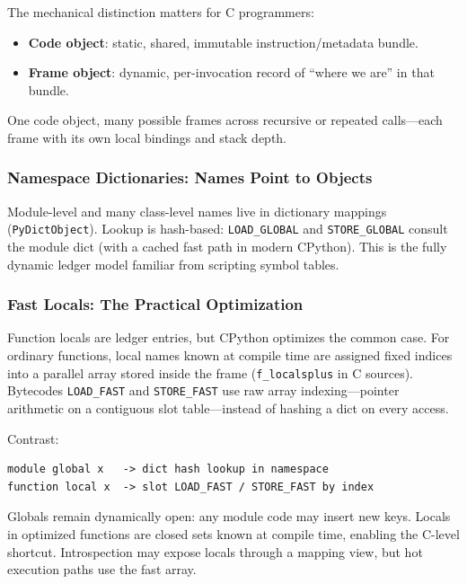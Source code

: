 The mechanical distinction matters for C programmers:

\begin{itemize}
    \item \textbf{Code object}: static, shared, immutable instruction/metadata bundle.
    \item \textbf{Frame object}: dynamic, per-invocation record of ``where we are'' in that bundle.
\end{itemize}

One code object, many possible frames across recursive or repeated calls---each frame with its own local bindings and stack depth.

\subsubsection{Namespace Dictionaries: Names Point to Objects}

Module-level and many class-level names live in dictionary mappings (\texttt{PyDictObject}). Lookup is hash-based: \texttt{LOAD\_GLOBAL} and \texttt{STORE\_GLOBAL} consult the module dict (with a cached fast path in modern CPython). This is the fully dynamic ledger model familiar from scripting symbol tables.

\subsubsection{Fast Locals: The Practical Optimization}

Function locals are ledger entries, but CPython optimizes the common case. For ordinary functions, local names known at compile time are assigned fixed indices into a parallel array stored inside the frame (\texttt{f\_localsplus} in C sources). Bytecodes \texttt{LOAD\_FAST} and \texttt{STORE\_FAST} use raw array indexing---pointer arithmetic on a contiguous slot table---instead of hashing a dict on every access.

Contrast:

\begin{verbatim}
module global x   -> dict hash lookup in namespace
function local x  -> slot LOAD_FAST / STORE_FAST by index
\end{verbatim}

Globals remain dynamically open: any module code may insert new keys. Locals in optimized functions are closed sets known at compile time, enabling the C-level shortcut. Introspection may expose locals through a mapping view, but hot execution paths use the fast array.

